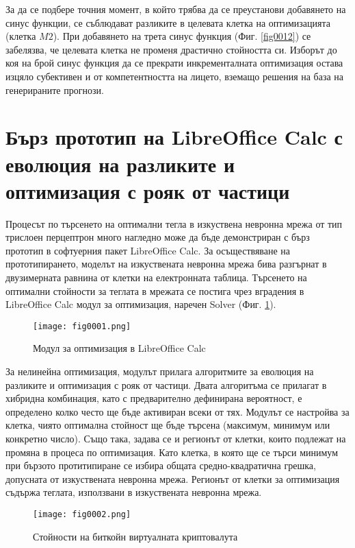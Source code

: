 За да се подбере точния момент, в който трябва да се преустанови добавянето на синус функции, се съблюдават разликите в целевата клетка на оптимизацията (клетка $M2$). При добавянето на трета синус функция (Фиг. \ref{fig0012}) се забелязва, че целевата клетка не променя драстично стойността си. Изборът до коя на брой синус функция да се прекрати инкременталната оптимизация остава изцяло субективен и от компетентността на лицето, вземащо решения на база на генерираните прогнози. 

\section{Бърз прототип на LibreOffice Calc с еволюция на разликите и оптимизация с рояк от частици}

Процесът по търсенето на оптимални тегла в изкуствена невронна мрежа от тип трислоен перцептрон много нагледно може да бъде демонстриран с бърз прототип в софтуерния пакет LibreOffice Calc. За осъществяване на прототипирането, моделът на изкуствената невронна мрежа бива разгърнат в двузимерната равнина от клетки на електронната таблица. Търсенето на оптимални стойности за теглата в мрежата се постига чрез вградения в LibreOffice Calc модул за оптимизация, наречен Solver (Фиг. \ref{fig0001}).

\begin{figure}[H]
  \centering
  \texttt{[image: fig0001.png]}
  \caption{Модул за оптимизация в LibreOffice Calc}
\label{fig0001}
\end{figure}

За нелинейна оптимизация, модулът прилага алгоритмите за еволюция на разликите и оптимизация с рояк от частици. Двата алгоритъма се прилагат в хибридна комбинация, като с предварително дефинирана вероятност, е определено колко често ще бъде активиран всеки от тях. Модулът се настройва за клетка, чиято оптимална стойност ще бъде търсена (максимум, минимум или конкретно число). Също така, задава се и регионът от клетки, които подлежат на промяна в процеса по оптимизация. Като клетка, в която ще се търси минимум при бързото протитипиране се избира общата средно-квадратична грешка, допусната от изкуствената невронна мрежа. Регионът от клетки за оптимизация съдържа теглата, използвани в изкуствената невронна мрежа. 

\begin{figure}[H]
  \centering
  \texttt{[image: fig0002.png]}
  \caption{Стойности на биткойн виртуалната криптовалута}
\label{fig0002}
\end{figure}

